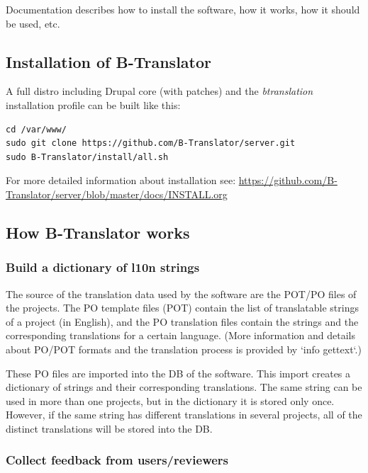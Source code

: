 \documentclass[11pt]{article}
\begin{document}
  Documentation describes how to install the software, how it works,
  how it should be used, etc.

\subsection{Installation of B-Translator}
\label{sec-8.1}


   A full distro including Drupal core (with patches) and the
   \emph{btranslation} installation profile can be built like this:

\begin{verbatim}
cd /var/www/
sudo git clone https://github.com/B-Translator/server.git
sudo B-Translator/install/all.sh
\end{verbatim}



   For more detailed information about installation see:
   \href{https://github.com/B-Translator/server/blob/master/docs/INSTALL.org}{https://github.com/B-Translator/server/blob/master/docs/INSTALL.org}

\subsection{How B-Translator works}
\label{sec-8.2}


\subsubsection{Build a dictionary of l10n strings}
\label{sec-8.2.1}


    The source of the translation data used by the software are the
    POT/PO files of the projects.  The PO template files (POT) contain
    the list of translatable strings of a project (in English), and the
    PO translation files contain the strings and the corresponding
    translations for a certain language.  (More information and details
    about PO/POT formats and the translation process is provided by
    `info gettext`.)

    These PO files are imported into the DB of the software. This
    import creates a dictionary of strings and their corresponding
    translations. The same string can be used in more than one
    projects, but in the dictionary it is stored only once. However, if
    the same string has different translations in several projects, all
    of the distinct translations will be stored into the DB.

\subsubsection{Collect feedback from users/reviewers}
\label{sec-8.2.2}
\end{document}
